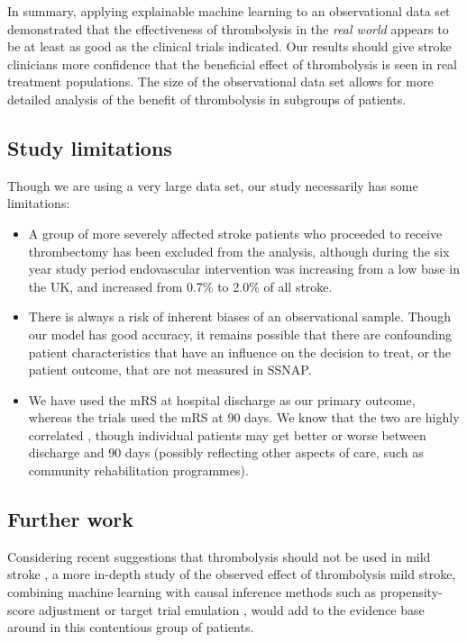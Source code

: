 In summary, applying explainable machine learning to an observational data set demonstrated that the effectiveness of thrombolysis in the \textit{real world} appears to be at least as good as the clinical trials indicated. Our results should give stroke clinicians more confidence that the beneficial effect of thrombolysis is seen in real treatment populations. The size of the observational data set allows for more detailed analysis of the benefit of thrombolysis in subgroups of patients.

\subsection{Study limitations}

Though we are using a very large data set, our study necessarily has some limitations:

\begin{itemize}
    \item A group of more severely affected stroke patients who proceeded to receive thrombectomy has been excluded from the analysis, although during the six year study period endovascular intervention was increasing from a low base in the UK, and increased from 0.7\% to 2.0\% of all stroke.
    \item There is always a risk of inherent biases of an observational sample. Though our model has good accuracy, it remains possible that there are confounding patient characteristics that have an influence on the decision to treat, or the patient outcome, that are not measured in SSNAP.
    \item We have used the mRS at hospital discharge as our primary outcome, whereas the trials used the mRS at 90 days.  We know that the two are highly correlated \cite{elhabr_predicting_2021}, though individual patients may get better or worse between discharge and 90 days (possibly reflecting other aspects of care, such as community rehabilitation programmes).
\end{itemize}

\subsection{Further work}

Considering recent suggestions that thrombolysis should not be used in mild stroke \cite{braksick_thrombolysis_2024, zhang_intravenous_2024}, a more in-depth study of the observed effect of thrombolysis mild stroke, combining machine learning with causal inference methods such as propensity-score adjustment \cite{rosenbaum_central_1983} or target trial emulation \cite{hernan_target_2022}, would add to the evidence base around in this contentious group of patients.